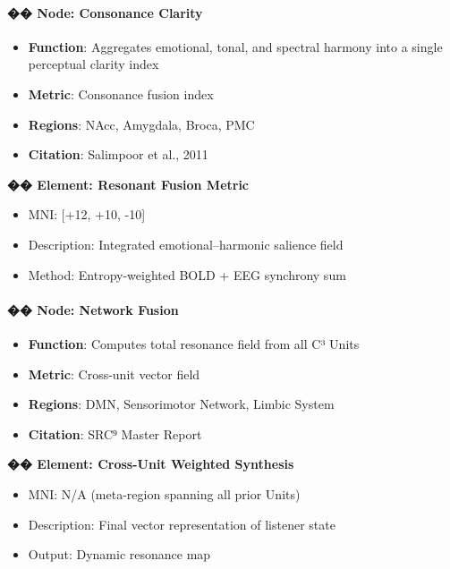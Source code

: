 \documentclass[10pt]{article}
\begin{document}
\paragraph{�� Node: Consonance Clarity}

\begin{itemize}
    \item \textbf{Function}: Aggregates emotional, tonal, and spectral harmony into a single perceptual clarity index
    \item \textbf{Metric}: Consonance fusion index
    \item \textbf{Regions}: NAcc, Amygdala, Broca, PMC
    \item \textbf{Citation}: Salimpoor et al., 2011
\end{itemize}

\textbf{�� Element: Resonant Fusion Metric}

\begin{itemize}
    \item MNI: [+12, +10, -10]
    \item Description: Integrated emotional–harmonic salience field
    \item Method: Entropy-weighted BOLD + EEG synchrony sum
\end{itemize}

\paragraph{�� Node: Network Fusion}

\begin{itemize}
    \item \textbf{Function}: Computes total resonance field from all C³ Units
    \item \textbf{Metric}: Cross-unit vector field
    \item \textbf{Regions}: DMN, Sensorimotor Network, Limbic System
    \item \textbf{Citation}: SRC⁹ Master Report
\end{itemize}

\textbf{�� Element: Cross-Unit Weighted Synthesis}

\begin{itemize}
    \item MNI: N/A (meta-region spanning all prior Units)
    \item Description: Final vector representation of listener state
    \item Output: Dynamic resonance map
\end{itemize}
\end{document}
